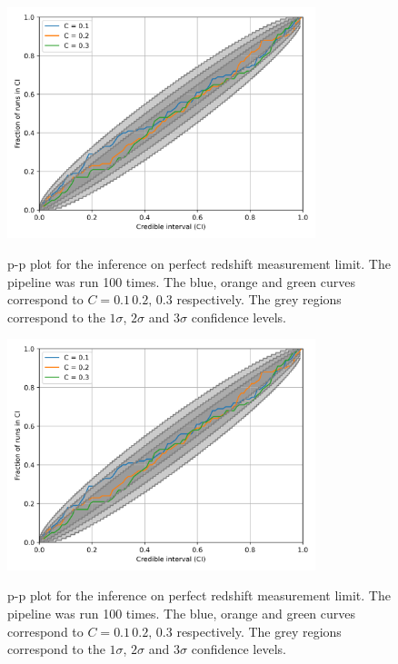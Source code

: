 \documentclass[%
preprint,
nofootinbib,
 amsmath,amssymb,
 aps,
]{revtex4-2}
\begin{document}
\newpage

\begin{figure}[!ht]
	\caption{p-p plot for the inference on perfect redshift measurement limit. The pipeline was run 100 times.
		The blue, orange and green curves correspond to $C=0.1 \, 0.2, \, 0.3$ respectively.
		The grey regions correspond to the $1\sigma$, $2\sigma$ and $3\sigma$ confidence levels.}
	\includegraphics[width=0.8\textwidth]{../src/figures/pp-analysis-perfect-redshift.png}
	\label{fig:pp-analysis-perfect-redshift}
\end{figure}

\begin{figure}[!ht]
	\caption{p-p plot for the inference on perfect redshift measurement limit. The pipeline was run 100 times.
		The blue, orange and green curves correspond to $C=0.1 \, 0.2, \, 0.3$ respectively.
		The grey regions correspond to the $1\sigma$, $2\sigma$ and $3\sigma$ confidence levels.}
	\includegraphics[width=0.8\textwidth]{../src/figures/pp-analysis-perfect-redshift.png}
	\label{fig:pp-analysis-full-inference}
\end{figure}
\end{document}
